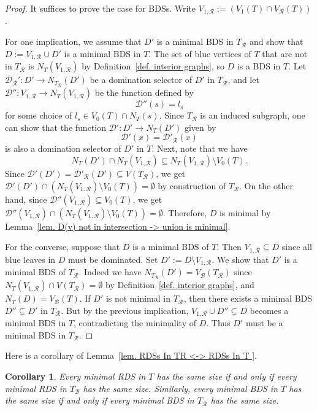 \documentclass[12pt, reqno]{amsart}
\theoremstyle{definition}
\theoremstyle{plain}
\newtheorem{corollary}[theorem]{Corollary}
\theoremstyle{definition}
\newcommand{\R}{\mathcal{R}}
\newcommand{\B}{\mathcal{B}}
\begin{document}
\begin{proof}
It suffices to prove the case for BDSs.
Write $V_{1,\R} := (V_1(T) \cap V_\R(T))$.

For one implication, we assume that $D'$ is a minimal BDS in $T_\R$ and show that $D := V_{1,\R} \cup D'$ is a minimal BDS in $T$.
The set of blue vertices of $T$ that are not in $T_\R$ is $N_T(V_{1,\R})$ by Definition~\ref{def. interior graphs}, so $D$ is a BDS in $T$.
Let $\mathcal{D}_\R':D' \to N_{T_\R}(D')$ be a domination selector of $D'$ in $T_\R$, and let $\mathcal{D}'':V_{1,\R} \to N_T(V_{1,\R})$ be the function defined by
$$
\mathcal{D}''(s) = l_s
$$
for some choice of $l_s \in V_0(T) \cap N_T(s)$.
Since $T_\R$ is an induced subgraph, one can show that the function $\mathcal{D'}: D' \to N_T(D')$ given by
$$
\mathcal{D'}(x) = \mathcal{D}'_\R(x)
$$
is also a domination selector of $D'$ in $T$.
Next, note that we have
$$
N_T(D') \cap N_T(V_{1,\R}) \subseteq N_T(V_{1,\R})\setminus V_0(T).
$$
Since $\mathcal{D}'(D') = \mathcal{D}'_\R(D') \subseteq V(T_\R)$, we get $\mathcal{D}'(D') \cap (N_T(V_{1,\R})\setminus V_0(T)) = \emptyset$ by construction of $T_\R$.
On the other hand, since $\mathcal{D}''(V_{1,\R}) \subseteq V_0(T)$, we get $\mathcal{D}''(V_{1,\R}) \cap (N_T(V_{1,\R})\setminus V_0(T)) = \emptyset$.
Therefore, $D$ is minimal by Lemma~\ref{lem. D(v) not in intersection -> union is minimal}.

For the converse, suppose that $D$ is a minimal BDS of $T$.
Then $V_{1,\R} \subseteq D$ since all blue leaves in $D$ must be dominated.
Set $D' := D \setminus V_{1,\R}$.
We show that $D'$ is a minimal BDS of $T_\R$.
Indeed we have $N_{T_\R}(D') = V_\B(T_\R)$ since $N_T(V_{1,\R}) \cap V(T_\R) = \emptyset$ by Definition~\ref{def. interior graphs}, and $N_T(D) = V_\B(T)$.
If $D'$ is not minimal in $T_\R$, then there exists a minimal BDS $D'' \subsetneq D'$ in $T_\R$.
But by the previous implication, $V_{1,\R} \cup D'' \subsetneq D$ becomes a minimal BDS in $T$, contradicting the minimality of $D$.
Thus $D'$ must be a minimal BDS in $T_{\R}$.
\end{proof}

Here is a corollary of Lemma~\ref{lem. RDSs In TR <-> RDSs In T }.

\begin{corollary}\label{cor. T WTD <-> TR BD-WTD and TB RD-WTD}
Every minimal RDS in $T$ has the same size if and only if every minimal RDS in $T_\B$ has the same size.
Similarly, every minimal BDS in $T$ has the same size if and only if every minimal BDS in $T_\R$ has the same size.    
\end{corollary}
\end{document}
